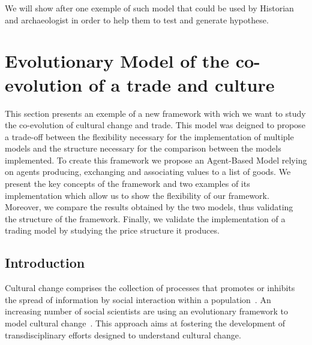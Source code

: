 \documentclass[a4paper]{article}
\begin{document}
We will show after one exemple of such model that could be used by Historian and archaeologist in order to help them to test and generate hypothese.


\section{Evolutionary Model of the co-evolution of a trade and culture}

This section presents an exemple of a new framework with wich we want to study the co-evolution of cultural change and trade. This model was deigned to propose a trade-off between the flexibility necessary for the implementation of multiple models and the structure necessary for the comparison between the models implemented. To create this framework we propose an Agent-Based Model relying on agents producing, exchanging and associating values to a list of goods. We present the key concepts of the framework and two examples of its implementation which allow us to show the flexibility of our framework. Moreover, we compare the results obtained by the two models, thus validating the structure of the framework. Finally, we validate the implementation of a trading model by studying the price structure it produces.


\subsection{Introduction}\label{sec:tc:intro}


Cultural change comprises the collection of processes that promotes or inhibits the spread of information by social interaction within a population~\cite{boyd_origin_2005}. An increasing number of social scientists are using an evolutionary framework to model cultural change~\cite{henrich_evolution_2003}. This approach aims at fostering the development of transdisciplinary efforts designed to understand cultural change.
\end{document}
